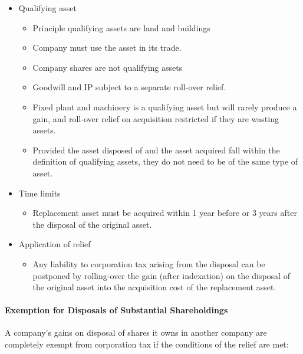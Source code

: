 \documentclass[
]{article}
\providecommand{\tightlist}{%
  \setlength{\itemsep}{0pt}\setlength{\parskip}{0pt}}
\begin{document}
\begin{itemize}
\tightlist
\item
  Qualifying asset

  \begin{itemize}
  \tightlist
  \item
    Principle qualifying assets are land and buildings
  \item
    Company must use the asset in its trade.
  \item
    Company shares are not qualifying assets
  \item
    Goodwill and IP subject to a separate roll-over relief.
  \item
    Fixed plant and machinery is a qualifying asset but will rarely
    produce a gain, and roll-over relief on acquisition restricted if
    they are wasting assets.
  \item
    Provided the asset disposed of and the asset acquired fall within
    the definition of qualifying assets, they do not need to be of the
    same type of asset.
  \end{itemize}
\item
  Time limits

  \begin{itemize}
  \tightlist
  \item
    Replacement asset must be acquired within 1 year before or 3 years
    after the disposal of the original asset.
  \end{itemize}
\item
  Application of relief

  \begin{itemize}
  \tightlist
  \item
    Any liability to corporation tax arising from the disposal can be
    postponed by rolling-over the gain (after indexation) on the
    disposal of the original asset into the acquisition cost of the
    replacement asset.
  \end{itemize}
\end{itemize}

\hypertarget{exemption-for-disposals-of-substantial-shareholdings}{%
\paragraph{Exemption for Disposals of Substantial
Shareholdings}\label{exemption-for-disposals-of-substantial-shareholdings}}

A company's gains on disposal of shares it owns in another company are
completely exempt from corporation tax if the conditions of the relief
are met:
\end{document}
